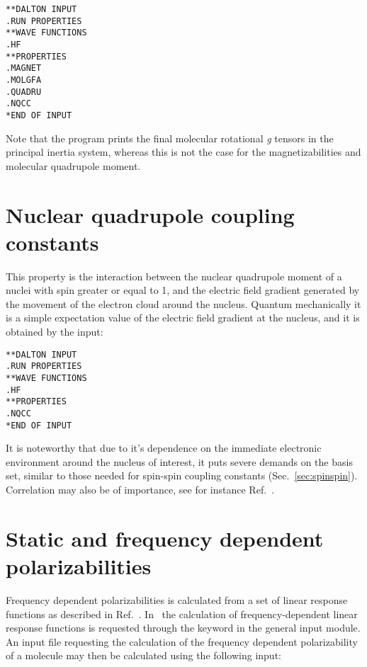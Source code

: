 \begin{verbatim}
**DALTON INPUT
.RUN PROPERTIES
**WAVE FUNCTIONS
.HF
**PROPERTIES
.MAGNET
.MOLGFA
.QUADRU
.NQCC
*END OF INPUT
\end{verbatim}

Note that the program prints the final molecular rotational {\em g}
tensors in the
principal inertia system, whereas this is not the case for the
magnetizabilities and molecular quadrupole moment.

\section{Nuclear quadrupole coupling constants}

This property is the interaction between the nuclear quadrupole
moment
of a nuclei with spin greater or equal to 1, and the electric field gradient
generated by the movement of the electron cloud around the nucleus.
Quantum mechanically it is a simple expectation value of the electric
field gradient  at the nucleus, and it is obtained by the input:

\begin{verbatim}
**DALTON INPUT
.RUN PROPERTIES
**WAVE FUNCTIONS
.HF
**PROPERTIES
.NQCC
*END OF INPUT
\end{verbatim}

It is noteworthy that due to it's dependence on the immediate
electronic environment around the nucleus of interest, it puts severe
demands on the basis set, similar to those needed for spin-spin
coupling
constants (Sec.~\ref{sec:spinspin}). Correlation may also be of
importance, see for instance Ref.~\cite{mjssocpjthkrcpl243}.

\section{Static and frequency dependent
polarizabilities}\label{sec:polari}

Frequency dependent polarizabilities is
calculated from a set of linear
response functions as described in
Ref.~\cite{jopjjcp82}. In \aba\ the
calculation of frequency-dependent linear response functions is
requested through the keyword  in the general input
module. An input file requesting the calculation of the frequency
dependent polarizability of a molecule may then be calculated using
the following input:

